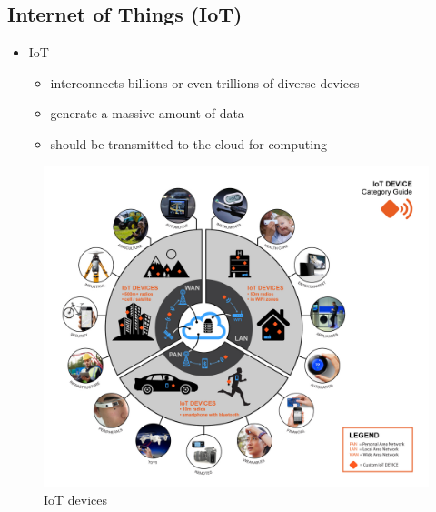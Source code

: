 \documentclass{beamer}
\begin{document}
\subsection[IoT]{Internet of Things (IoT)}
\begin{frame}
\begin{itemize}
	\item IoT
	\begin{itemize}
		\item<1-> {interconnects billions or
			even trillions of diverse devices}
		\item<2-> {generate a massive
			amount of data}
		\item<3-> {should be transmitted to the cloud for
			computing}
	\end{itemize}
\end{itemize}
\begin{figure}
	\includegraphics[scale=0.12]{IoT1}
	\caption{IoT devices}
	\label{fig:iot1}
\end{figure}
\end{frame}
\end{document}
